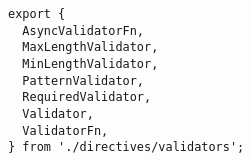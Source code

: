 \begin{verbatim}
export {
  AsyncValidatorFn,
  MaxLengthValidator,
  MinLengthValidator,
  PatternValidator,
  RequiredValidator,
  Validator,
  ValidatorFn,
} from './directives/validators';
\end{verbatim}
